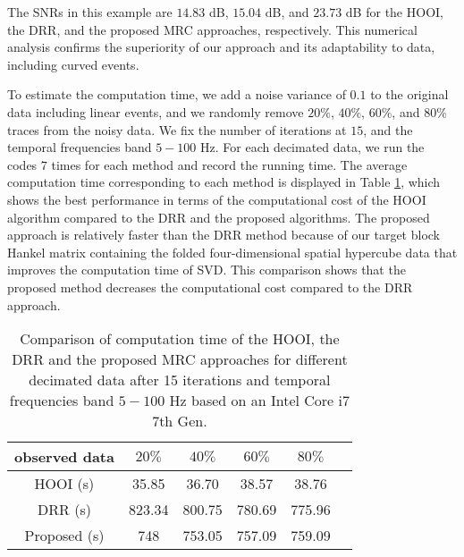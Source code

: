 
The SNRs in this example are $14.83$ dB, $15.04$ dB, and $23.73$ dB for the HOOI, the DRR, and the proposed MRC approaches, respectively. This numerical analysis confirms the superiority of our approach and its adaptability to data, including curved events.

To estimate the computation time, we add a noise variance of $0.1$ to the original data including linear events, and we randomly remove $20\%$, $40\%$, $60\%$, and $80\%$ traces from the noisy data. We fix the number of iterations at $15$, and the temporal frequencies band $5 - 100$ Hz. For each decimated data, we run the codes $7$ times for each method and record the running time. The average computation time corresponding to each method is displayed in Table \ref{tbl:table1}, which shows the best performance in terms of the computational cost of the HOOI algorithm compared to the DRR and the proposed  algorithms. The proposed  approach is relatively faster than the DRR method because of our target block Hankel matrix containing the folded four-dimensional spatial hypercube data that improves the computation time of SVD. This comparison shows that the proposed  method decreases the computational cost compared to the DRR approach.

\begin{table}[h]
	\caption{Comparison of computation time  of the HOOI, the DRR and the proposed MRC approaches for different decimated data after 15 iterations and temporal frequencies band $5 - 100$ Hz based on an Intel Core i7 7th Gen.}
	\begin{center}
		\begin{tabular}{c c c c c c} 
			\hline observed data &$20\%$& $40\%$&$60\%$&$80\%$&\\ 
			\hline HOOI (s) & 35.85 & 36.70 & 38.57 & 38.76\\
			DRR (s) & 823.34 & 800.75 & 780.69 & 775.96\\
			Proposed (s) & 748 & 753.05 & 757.09& 759.09\\
			\hline
		\end{tabular} 
	\end{center}
	\label{tbl:table1}
\end{table}

